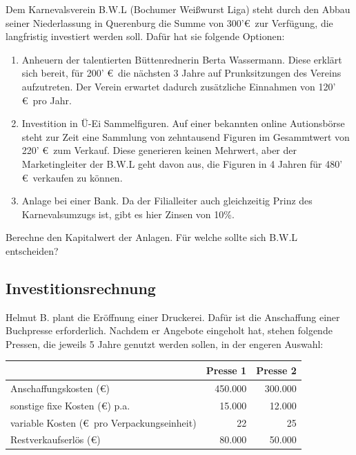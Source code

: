 \documentclass[11pt, a4paper]{article}
\newif\ifshowsolution
\begin{document}
Dem Karnevalsverein B.W.L (Bochumer Weißwurst Liga) steht durch den Abbau seiner Niederlassung in Querenburg die Summe von 300'\euro \ zur Verfügung, die langfristig investiert werden soll. Dafür hat sie folgende Optionen:
\begin{enumerate}
	\item Anheuern der talentierten Büttenrednerin Berta Wassermann. Diese erklärt sich bereit, für 200' \euro \ die nächsten 3 Jahre auf Prunksitzungen des Vereins aufzutreten. Der Verein erwartet dadurch zusätzliche Einnahmen von 120' \euro \ pro Jahr.
	\item Investition in Ü-Ei Sammelfiguren. Auf einer bekannten online Autionsbörse steht zur Zeit eine Sammlung von zehntausend Figuren im Gesammtwert von 220' \euro \ zum Verkauf. Diese generieren keinen Mehrwert, aber der Marketingleiter der B.W.L geht davon aus, die Figuren in 4 Jahren für 480' \euro \ verkaufen zu können.
	\item Anlage bei einer Bank. Da der Filialleiter auch gleichzeitig Prinz des Karnevalsumzugs ist, gibt es hier Zinsen von 10\%.
\end{enumerate}
Berechne den Kapitalwert der Anlagen. Für welche sollte sich B.W.L entscheiden?

\ifshowsolution
	\begin{description}
		\item[Anlage 1] $- 200' + 120' \cdot \frac{1.10^3 - 1}{1.10^3 \cdot 0.1} \approx 98.4222'$
		\item[Anlage 2] $- 220' + 480' \cdot \frac{1}{1.10^4} \approx 107.8465'$
		\item[Anlage 3] 0, weil Standardoption (Interner Zinsfuß oder so)
	\end{description}
	Der Verein sollte sich also für Anlage 2 entscheiden.
\fi

\subsection{Investitionsrechnung}
Helmut B. plant die Eröffnung einer Druckerei. Dafür ist die Anschaffung einer Buchpresse erforderlich. Nachdem er Angebote eingeholt hat, stehen folgende Pressen, die jeweils 5 Jahre genutzt werden sollen, in der engeren Auswahl:

\begin{tabular}{lrr}
	& Presse 1 & Presse 2 \\ \hline
	Anschaffungskosten (\euro) & 450.000 & 300.000 \\
	sonstige fixe Kosten (\euro) p.a. & 15.000 & 12.000 \\
	variable Kosten (\euro \ pro Verpackungseinheit) & 22 & 25 \\
	Restverkaufserlös (\euro) & 80.000 & 50.000
\end{tabular}
\end{document}
